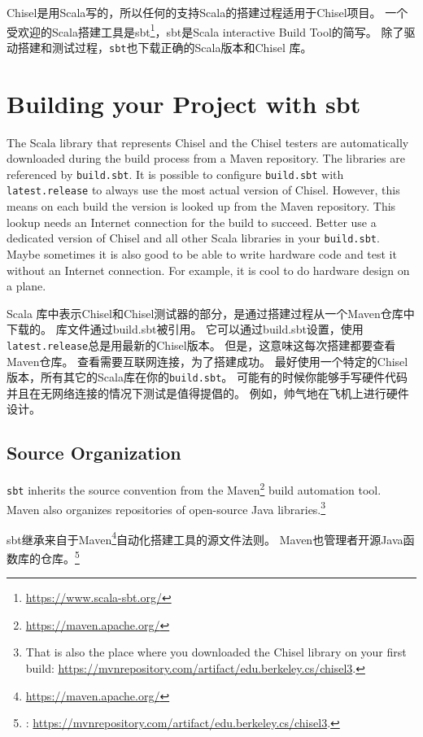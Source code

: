 \documentclass[%
    10pt,
    headinclude, footexclude,
    openright, %
    notitlepage,
    cleardoubleempty,
    headsepline,
    pointlessnumbers,
    bibtotoc, idxtotoc,
    ]{scrbook}
\newcommand{\code}[1]{{\small{\texttt{#1}}}}
\newcommand{\myref}[2]{\href{#1}{#2}}
\renewcommand{\myref}[2]{{#2}{\footnote{\url{#1}}}}
\begin{document}
Chisel是用Scala写的，所以任何的支持Scala的搭建过程适用于Chisel项目。
一个受欢迎的Scala搭建工具是\myref{https://www.scala-sbt.org/}{sbt}，sbt是Scala interactive Build Tool的简写。
除了驱动搭建和测试过程，\code{sbt}也下载正确的Scala版本和Chisel 库。


\section{Building your Project with sbt}

The Scala library that represents Chisel and the Chisel testers are automatically
downloaded during the build process from a Maven repository.
The libraries are referenced by \code{build.sbt}. It is possible to configure \code{build.sbt}
with \code{latest.release} to always use the most actual version of Chisel.
However, this means on each build the version is looked up from the Maven
repository. This lookup needs an Internet connection for the build to succeed.
Better use a dedicated version of Chisel and all other Scala libraries in your \code{build.sbt}.
Maybe sometimes it is also good to be able to write hardware code and test it without an Internet connection.
For example, it is cool to do hardware design on a plane.

Scala 库中表示Chisel和Chisel测试器的部分，是通过搭建过程从一个Maven仓库中下载的。
库文件通过build.sbt被引用。
它可以通过build.sbt设置，使用\code{latest.release}总是用最新的Chisel版本。
但是，这意味这每次搭建都要查看Maven仓库。
查看需要互联网连接，为了搭建成功。
最好使用一个特定的Chisel版本，所有其它的Scala库在你的\code{build.sbt}。
可能有的时候你能够手写硬件代码并且在无网络连接的情况下测试是值得提倡的。
例如，帅气地在飞机上进行硬件设计。


\subsection{Source Organization}

\code{sbt} inherits the source convention from the \myref{https://maven.apache.org/}{Maven}
build automation tool. Maven also organizes repositories of open-source Java libraries.\footnote{That is
also the place where you downloaded the Chisel library on your first build:
\url{https://mvnrepository.com/artifact/edu.berkeley.cs/chisel3}.}

sbt继承来自于\myref{https://maven.apache.org/}{Maven}自动化搭建工具的源文件法则。
Maven也管理者开源Java函数库的仓库。\footnote{:
\url{https://mvnrepository.com/artifact/edu.berkeley.cs/chisel3}.}
\end{document}
